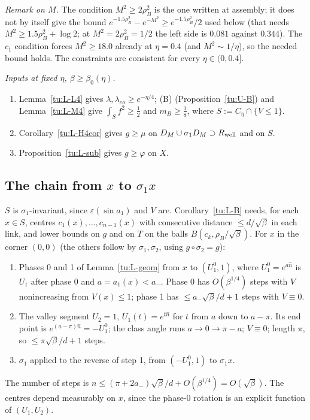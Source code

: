 \noindent\emph{Remark on $M$.} The condition $M^2\ge2\rho_B^2$ is the one written at assembly; it does not by itself give the
bound $e^{-1.5\rho_B^2}-e^{-M^2}\ge e^{-1.5\rho_B^2}/2$ used below (that needs $M^2\ge1.5\rho_B^2+\log2$; at $M^2=2\rho_B^2=1/2$ the left
side is $0.081$ against $0.344$). The $c_1$ condition forces $M^2\ge18.0$ already at $\eta=0.4$ (and $M^2\sim1/\eta$), so the needed
bound holds. The constraints are consistent for every $\eta\in(0,0.4]$.

\noindent\emph{Inputs at fixed $\eta$, $\beta\ge\beta_0(\eta)$.}
\begin{enumerate}
\item Lemma~\ref{tu:L-L4} gives $\lambda,\lambda_{eo}\ge e^{-\eta/4}$; (B) (Proposition~\ref{tu:U-B}) and Lemma~\ref{tu:L-M4} give
$\int_Sf^2\ge\frac12$ and $m_B\ge\frac18$, where $S:=C_\eta\cap\{V\le1\}$.
\item Corollary~\ref{tu:L-H4cor} gives $g\ge\mu$ on $D_M\cup\sigma_1D_M\supset R_{\rm well}$ and on $S$.
\item Proposition~\ref{tu:L-sub} gives $g\ge\varphi$ on $X$.
\end{enumerate}

\subsection{The chain from $x$ to $\sigma_1x$}\label{tu:L-chainsec}
$S$ is $\sigma_1$-invariant, since $\varepsilon(\sin a_1)$ and $V$ are. Corollary~\ref{tu:L-B} needs, for each $x\in S$, centres
$c_1(x),\dots,c_{n-1}(x)$ with consecutive distance $\le d/\sqrt\beta$ in each link, and lower bounds on $g$ and on $T$ on the
balls $B(c_k,\rho_B/\sqrt\beta)$. For $x$ in the corner $(0,0)$ (the others follow by $\sigma_1,\sigma_2$, using $g\circ\sigma_2=g$):
\begin{enumerate}
\item Phases 0 and 1 of Lemma~\ref{tu:L-geom} from $x$ to $(U_1^0,1)$, where $U_1^0=e^{a\hat n}$ is $U_1$ after phase 0 and
$a=a_1(x)<a_-$. Phase 0 has $O(\beta^{1/4})$ steps with $V$ nonincreasing from $V(x)\le1$; phase 1 has $\le a_-\sqrt\beta/d+1$ steps with $V\equiv0$.
\item The valley segment $U_2=1$, $U_1(t)=e^{t\hat n}$ for $t$ from $a$ down to $a-\pi$. Its end point is $e^{(a-\pi)\hat n}=-U_1^0$; the
class angle runs $a\to0\to\pi-a$; $V\equiv0$; length $\pi$, so $\le\pi\sqrt\beta/d+1$ steps.
\item $\sigma_1$ applied to the reverse of step 1, from $(-U_1^0,1)$ to $\sigma_1x$.
\end{enumerate}
The number of steps is $n\le(\pi+2a_-)\sqrt\beta/d+O(\beta^{1/4})=O(\sqrt\beta)$. The centres depend measurably on $x$, since the
phase-0 rotation is an explicit function of $(U_1,U_2)$.

